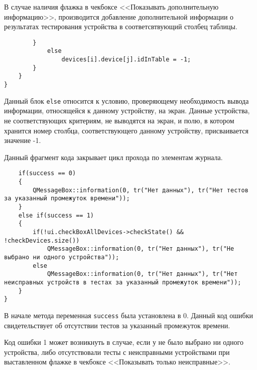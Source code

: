 В случае наличия флажка в чекбоксе <<Показывать дополнительную информацию>>, производится добавление дополнительной
информации о результатах тестирования устройства в соответсвтвующий столбец таблицы.
\medskip
\begin{verbatim}
		}
			else
				devices[i].device[j].idInTable = -1;
		}
	}
}
\end{verbatim}
\medskip

Данный блок \texttt{else} относится к условию, проверяющему необходимость вывода информации, относящейся к данному
устройству, на экран. Данные устройства, не соответствующих критериям, не выводятся на экран, и полю, в котором хранится
номер столбца, соответствующего данному устройству, присваивается значение -1.

Данный фрагмент кода закрывает цикл прохода по элементам журнала.
\medskip
\begin{verbatim}
	if(success == 0)
	{
		QMessageBox::information(0, tr("Нет данных"), tr("Нет тестов за указанный промежуток времени"));
	}
	else if(success == 1)
	{
		if(!ui.checkBoxAllDevices->checkState() && !checkDevices.size())
			QMessageBox::information(0, tr("Нет данных"), tr("Не выбрано ни одного устройства"));
		else
			QMessageBox::information(0, tr("Нет данных"), tr("Нет неисправных устройств в тестах за указанный промежуток времени"));
	}
}
\end{verbatim}
\medskip

В начале метода переменная \texttt{success} была установлена в 0. Данный код ошибки свидетельствует об отсутствии тестов
за указанный промежуток времени.

Код ошибки 1 может возникнуть в случае, если у не было выбрано ни одного устройства, либо отсутствовали тесты с
неисправными устройствами при выставленном флажке в чекбоксе <<Показывать только неисправные>>.
